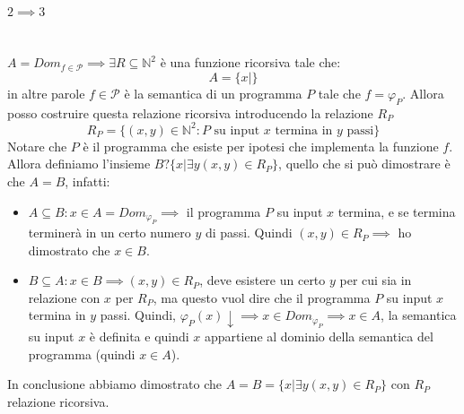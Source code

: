 \documentclass{article}
\begin{document}
\paragraph{$2\implies 3$}\mbox{}\\
$A=Dom_{f\in\mathcal{P}}\implies\exists R\subseteq\mathbb{N}^2$ è una funzione ricorsiva tale che:
$$A=\{x|\}$$
in altre parole $f\in\mathcal{P}$ è la semantica di un programma $P$ tale che $f=\varphi_P$.
Allora posso costruire questa relazione ricorsiva introducendo la relazione $R_P$
$$R_P=\{(x,y)\in\mathbb{N}^2:P\text{ su input }x\text{ termina in }y\text{ passi}\}$$
Notare che $P$ è il programma che esiste per ipotesi che implementa la funzione $f$. Allora
definiamo l'insieme $B?\{x|\exists y(x,y)\in R_P\}$, quello che si può dimostrare è che $A=B$,
infatti:

\begin{itemize}
    \item $A\subseteq B: x\in A=Dom_{\varphi_P}\implies$ il programma $P$
    su input $x$ termina, e se termina terminerà in un certo numero $y$ di passi.
    Quindi $(x,y)\in R_P \implies$ ho dimostrato che $x\in B$.

    \item $B\subseteq A: x\in B\implies (x,y)\in R_P$, deve esistere un certo $y$ per cui
    sia in relazione con $x$ per $R_P$, ma questo vuol dire che il programma $P$
    su input $x$ termina in $y$ passi. Quindi, $\varphi_P(x)\downarrow\implies x\in Dom_{\varphi_P}\implies x\in A$,
    la semantica su input $x$ è definita e quindi $x$ appartiene al dominio della semantica del programma (quindi
    $x\in A$).
\end{itemize}
In conclusione abbiamo dimostrato che $A=B=\{x|\exists y(x,y)\in R_P\}$ con $R_P$ relazione ricorsiva.
\end{document}
